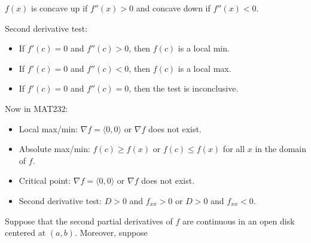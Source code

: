 \documentclass{article}
\begin{document}
\( f(x) \) is concave up if \( f''(x) > 0 \) and concave down if \( f''(x) < 0 \).

\begin{notebox}
    Second derivative test:
    \begin{itemize}
        \item If \( f'(c) = 0 \) and \( f''(c) > 0 \), then \( f(c) \) is a local min.
        \item If \( f'(c) = 0 \) and \( f''(c) < 0 \), then \( f(c) \) is a local max.
        \item If \( f'(c) = 0 \) and \( f''(c) = 0 \), then the test is inconclusive.
    \end{itemize}
\end{notebox}

Now in MAT232:
\begin{itemize}
    \item Local max/min: \( \nabla f = \langle 0, 0 \rangle \) or \( \nabla f \) does not exist.
    \item Absolute max/min: \( f(c) \geq f(x) \) or \( f(c) \leq f(x) \) for all \( x \) in the domain of \( f \).
    \item Critical point: \( \nabla f = \langle 0, 0 \rangle \) or \( \nabla f \) does not exist.
    \item Second derivative test: \( D > 0 \) and \( f_{xx} > 0 \) or \( D > 0 \) and \( f_{xx} < 0 \).
\end{itemize}

Suppose that the second partial derivatives of \( f \) are continuous in an open disk centered at \( (a, b) \). Moreover, suppose 
\end{document}

